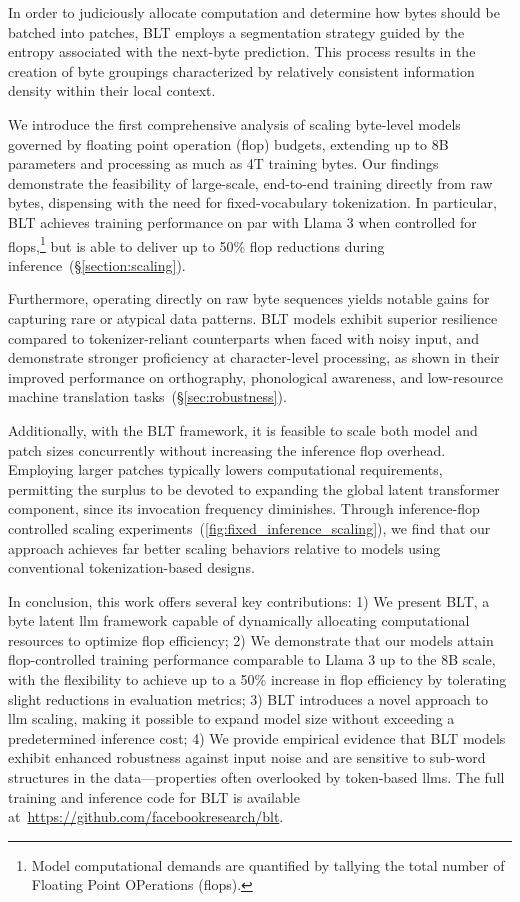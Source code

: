 In order to judiciously allocate computation and determine how bytes should be batched into patches, {\textsc BLT} employs a segmentation strategy guided by the entropy associated with the next-byte prediction. This process results in the creation of byte groupings characterized by relatively consistent information density within their local context.

We introduce the first comprehensive analysis of scaling byte-level models governed by floating point operation (flop) budgets, extending up to 8B parameters and processing as much as 4T training bytes. Our findings demonstrate the feasibility of large-scale, end-to-end training directly from raw bytes, dispensing with the need for fixed-vocabulary tokenization. In particular, {\textsc BLT} achieves training performance on par with Llama 3 when controlled for flops,\footnote{Model computational demands are quantified by tallying the total number of Floating Point OPerations (flops).} but is able to deliver up to 50\% flop reductions during inference~(\S\ref{section:scaling}).

Furthermore, operating directly on raw byte sequences yields notable gains for capturing rare or atypical data patterns. {\textsc BLT} models exhibit superior resilience compared to tokenizer-reliant counterparts when faced with noisy input, and demonstrate stronger proficiency at character-level processing, as shown in their improved performance on orthography, phonological awareness, and low-resource machine translation tasks~(\S\ref{sec:robustness}).

Additionally, with the {\textsc BLT} framework, it is feasible to scale both model and patch sizes concurrently without increasing the inference flop overhead. Employing larger patches typically lowers computational requirements, permitting the surplus to be devoted to expanding the global latent transformer component, since its invocation frequency diminishes. Through inference-flop controlled scaling experiments~(\autoref{fig:fixed_inference_scaling}), we find that our approach achieves far better scaling behaviors relative to models using conventional tokenization-based designs.

In conclusion, this work offers several key contributions: 1) We present {\textsc BLT}, a byte latent llm framework capable of dynamically allocating computational resources to optimize flop efficiency; 2) We demonstrate that our models attain flop-controlled training performance comparable to Llama 3 up to the 8B scale, with the flexibility to achieve up to a 50\% increase in flop efficiency by tolerating slight reductions in evaluation metrics; 3) {\textsc BLT} introduces a novel approach to llm scaling, making it possible to expand model size without exceeding a predetermined inference cost; 4) We provide empirical evidence that {\textsc BLT} models exhibit enhanced robustness against input noise and are sensitive to sub-word structures in the data—properties often overlooked by token-based llms. The full training and inference code for {\textsc BLT} is available at~\url{https://github.com/facebookresearch/blt}.

